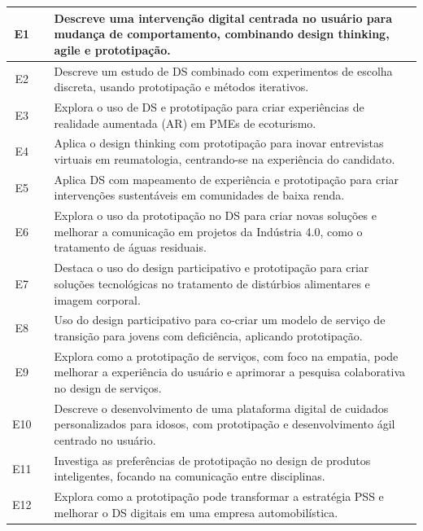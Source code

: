 \begin{longtable}{|c|m{4cm}|m{10cm}|}
	E1  & \cite{asbjornsen2022echange} & Descreve uma intervenção digital centrada no usuário para mudança de comportamento, combinando design thinking, agile e prototipação. \\ \hline
	E2  & \cite{dehmel2021weather} & Descreve um estudo de DS combinado com experimentos de escolha discreta, usando prototipação e métodos iterativos. \\ \hline
	E3  & \cite{giraldo2024ecotourism} & Explora o uso de DS e prototipação para criar experiências de realidade aumentada (AR) em PMEs de ecoturismo. \\ \hline
	E4  & \cite{kumar2023rheumatology} & Aplica o design thinking com prototipação para inovar entrevistas virtuais em reumatologia, centrando-se na experiência do candidato. \\ \hline
	E5  & \cite{lambe2022capabilities} & Aplica DS com mapeamento de experiência e prototipação para criar intervenções sustentáveis em comunidades de baixa renda. \\ \hline
	E6  & \cite{lee2023industry} & Explora o uso da prototipação no DS para criar novas soluções e melhorar a comunicação em projetos da Indústria 4.0, como o tratamento de águas residuais. \\ \hline
	E7  & \cite{milton2021eatingdisorders} & Destaca o uso do design participativo e prototipação para criar soluções tecnológicas no tratamento de distúrbios alimentares e imagem corporal. \\ \hline
	E8  & \cite{seko2024transitions} & Uso do design participativo para co-criar um modelo de serviço de transição para jovens com deficiência, aplicando prototipação. \\ \hline
	E9  & \cite{soto2023prototyping} & Explora como a prototipação de serviços, com foco na empatia, pode melhorar a experiência do usuário e aprimorar a pesquisa colaborativa no design de serviços. \\ \hline
	E10 & \cite{villa2022integratedcare} & Descreve o desenvolvimento de uma plataforma digital de cuidados personalizados para idosos, com prototipação e desenvolvimento ágil centrado no usuário. \\ \hline
	E11 & \cite{wang2023smartproducts} & Investiga as preferências de prototipação no design de produtos inteligentes, focando na comunicação entre disciplinas. \\ \hline
	E12 & \cite{yan2022pssvalue} & Explora como a prototipação pode transformar a estratégia PSS e melhorar o DS digitais em uma empresa automobilística. \\ \hline

\end{longtable}
